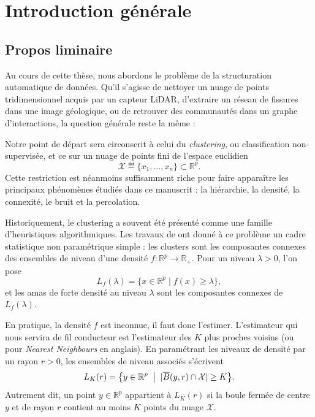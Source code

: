 \chapter{Introduction générale}
\label{sec:Introduction}


\section{Propos liminaire}

Au cours de cette thèse, nous abordons le problème de la structuration automatique de données.
Qu'il s'agisse de nettoyer un nuage de points tridimensionnel acquis par un
capteur LiDAR, d'extraire un réseau de fissures dans une image géologique, ou de retrouver des communautés dans un graphe d'interactions, la question générale reste la même : 

Notre point de départ sera circonscrit à celui du \emph{clustering}, ou classification non-supervisée, et ce sur un nuage de points fini de l'espace euclidien
\[
    \mathcal X \eqdef \bigl\{x_1,\ldots,x_n\bigr\} \subset \mathbb{R}^p.
\]
Cette restriction est néanmoins suffisamment riche pour faire apparaître les principaux phénomènes étudiés dans ce manuscrit : la hiérarchie, la densité, la connexité, le bruit et la percolation.

Historiquement, le clustering a souvent été présenté comme une famille d'heuristiques algorithmiques. Les travaux de  \cite{hartigan81} ont donné à ce problème un cadre statistique non paramétrique simple : les clusters sont les composantes connexes des ensembles de niveau d'une densité
$f : \mathbb{R}^p \to \mathbb{R}_+$. Pour un niveau $\lambda > 0$, l'on pose
\[
    L_f(\lambda)
    =
    \{x \in \mathbb{R}^p \mid f(x) \geq \lambda\},
\]
et les amas de forte densité au niveau $\lambda$ sont les composantes connexes de $L_f(\lambda)$.

En pratique, la densité $f$ est inconnue, il faut donc l'estimer. L'estimateur qui nous servira de fil conducteur est l'estimateur des $K$ plus proches voisins  \cite{BiauDevroye, Zhao2022KNN} (ou \KNN pour \emph{Nearest Neighbours} en anglais). En paramétrant les niveaux de densité par un rayon $r>0$, les ensembles de niveau associés s'écrivent
\[
    L_K(r)
    =
    \bigl\{
        y\in\mathbb{R}^p
        \;\bigm|\;
        \lvert \overline B(y,r)\cap \mathcal X \rvert \geq K
    \bigr\}.
\]
Autrement dit, un point $y \in \mathbb R^p$ appartient à $L_K(r)$ si la boule fermée de centre $y$ et de rayon $r$ contient au moins $K$ points du nuage $\mathcal X$.

